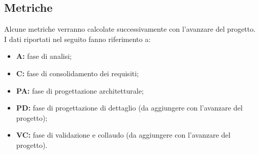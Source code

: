 \subsection{Metriche}
Alcune metriche verranno calcolate successivamente con l'avanzare del progetto.\\
I dati riportati nel seguito fanno riferimento a:
\begin{itemize}
    \item \textbf{A:} fase di analisi;
    \item \textbf{C:} fase di consolidamento dei requisiti;
    \item \textbf{PA:} fase di progettazione architetturale;
    \item \textbf{PD:} fase di progettazione di dettaglio (da aggiungere con l'avanzare del progetto);
    \item \textbf{VC:} fase di validazione e collaudo (da aggiungere con l'avanzare del progetto).
\end{itemize}
\newpage
